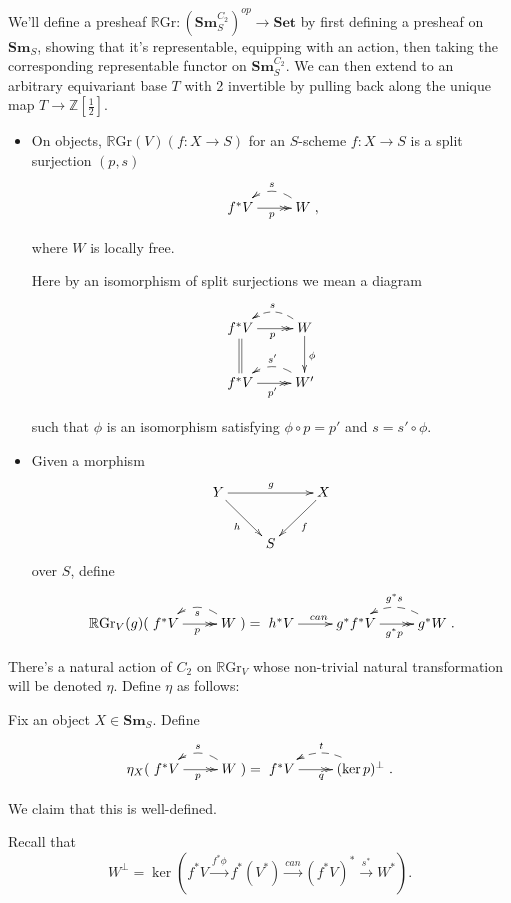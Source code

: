 \documentclass[edeposit,fullpage]{uiucthesis2009}
\newcommand{\Z}{\mathbb Z}
\newcommand{\RGr}{\mathbb R\mathrm{Gr}}
\newcommand{\Set}{\mathbf{Set}}
\newcommand{\Sm}[1]{\mathbf{Sm}_{#1}}
\theoremstyle{plain}
\numberwithin{lemma}{section}
\theoremstyle{definition}
\begin{document}
We'll define a presheaf $\RGr : (\Sm{S}^{C_2})^{op} \rightarrow \Set$
by first defining a presheaf on $\Sm{S}$, showing that it's
representable, equipping with an action, then taking the corresponding
representable functor on $\Sm{S}^{C_2}$. We can then extend to an
arbitrary equivariant base $T$ with 2 invertible by pulling back along the unique map $T
\rightarrow \Z[\frac{1}{2}]$.

\begin{itemize}
\item On objects, $\RGr(V)(f: X \rightarrow S)$ for an $S$-scheme $f :
  X \rightarrow S$ is a split surjection $(p,s)$
\[
\xymatrix{f^*V \ar@{>>}[r]_p & \ar@/_1.0pc/@{-->}[l]_sW},
\]

where $W$ is locally free. 

Here by an isomorphism of split surjections we mean a diagram
\[
\xymatrix{f^*V \ar@{>>}[r]_p \ar@{=}[d]& \ar@/_1.0pc/@{-->}[l]_sW \ar[d]^\phi\\
f^*V \ar@{>>}[r]_{p'} & \ar@/_1.0pc/@{-->}[l]_{s'}W'}
\]

such that $\phi$ is an isomorphism satisfying $\phi \circ p = p'$ and $s = s'\circ \phi$.

\item Given a morphism 
\[
\xymatrix{Y\ar[dr]_h \ar[rr]^g &&X\ar[dl]^f\\& S&}
\]
over $S$, define
\[
\RGr_V(g)(\xymatrix{f^*V \ar@{>>}[r]_p & \ar@/_1.0pc/@{-->}[l]^sW}) = 
\xymatrix{h^*V \ar[r]^{can} & g^*f^*V \ar@{>>}[r]_{g^*p} &
  \ar@/_1.0pc/@{-->}[l]_{g^*s} g^*W}.
\]
\end{itemize}
There's a natural action of $C_2$ on $\RGr_V$ whose non-trivial
natural transformation will be denoted $\eta$. Define $\eta$ as
follows: 

 Fix an object $X \in \Sm{S}$. Define
\[
\eta_X(\xymatrix{f^*V \ar@{>>}[r]_p & \ar@/_1.0pc/@{-->}[l]_sW}) =
\xymatrix{f^*V \ar@{>>}[r]_q & \ar@/_1.0pc/@{-->}[l]_t(\ker p)^\perp}.
\]

We claim that this is well-defined. %

Recall that 
\[
W^\perp = \ker(f^*V \xrightarrow{f^*\phi} f^*(V^*) \xrightarrow{can}
(f^*V)^* \xrightarrow{s^*} W^*).
\]
\end{document}
